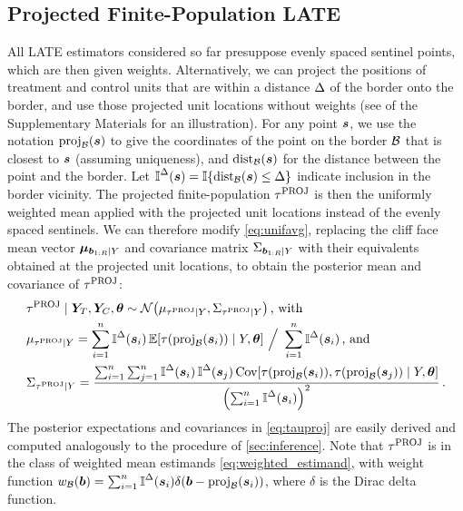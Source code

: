 \subsection{Projected Finite-Population LATE}
All LATE estimators considered so far presuppose evenly spaced sentinel points, which are then given weights.
Alternatively, we can project the positions of treatment and control units that are within a distance \(\Delta\) of the border onto the border, and use those projected unit locations without weights (see  of the Supplementary Materials for an illustration).
For any point \(\bm{s}\), we use the notation \(\proj_{\border}\del{\svec}\) to give the coordinates of the point on the border \(\mathcal{B}\) that is closest to \(\bm{s}\) (assuming uniqueness), and \(\dist_{\border}\del{\svec}\) for the distance between the point and the border.
Let \(\vicinity{\svec} = \allowbreak \Ind\cbr{\dist_{\border}\del{\svec} \le \buffer} \) indicate inclusion in the border vicinity.
The projected finite-population \(\tau^{\mathrm{PROJ}}\) is then the uniformly weighted mean applied with the projected unit locations instead of the evenly spaced sentinels.
We can therefore modify \autoref{eq:unifavg}, replacing the cliff face mean vector \(\bm{\mu}_{\bm{b}_{1:R} \mid Y}\)
and covariance matrix \(\Sigma_{\bm{b}_{1:R} \mid Y}\)
with their equivalents obtained at the projected unit locations,
to obtain the posterior mean and covariance of \(\tau^{\mathrm{PROJ}}\):
\begin{equation}\begin{split}
    &\tauproj \mid \yt{}, \yc{}, \hyperparam \sim \normal\del{\mu_{\tauproj \mid Y}, \Sigma_{\tauproj \mid Y}}\,\text{, with} \\
    &\mu_{\tauproj \mid Y} = 
    \sum_{i=1}^{n}
    \vicinity{\svec_i}
    \E\sbr{
        \tau\del{
            \proj_{\border}\del{\svec_i}
        }
        \mid Y, \hyperparam
    } 
    \ 
    \Big/
    \ 
        \sum_{i=1}^{n}
        \vicinity{\svec_i}
    \,\text{, and}\\
    &\Sigma_{\tauproj \mid Y} = 
    \frac{
        \sum_{i=1}^{n} 
        \sum_{j=1}^{n} 
        \vicinity{\svec_i}
        \vicinity{\svec_j}
        \cov\sbr{
            \tau\del{
                \proj_{\border}\del{\svec_i}
            },
            \tau\del{
                \proj_{\border}\del{\svec_j}
            }
            \mid Y, \hyperparam
        }
    }{
        \del{
            \sum_{i=1}^{n}
            \vicinity{\svec_i}
        }^2
    }
    \,.
\end{split}
\label{eq:tauproj}
\end{equation}
The posterior expectations and covariances in \autoref{eq:tauproj} are easily derived and computed analogously to the procedure of \autoref{sec:inference}.
Note that \(\tau^{\mathrm{PROJ}}\) is in the class of weighted mean estimands \autoref{eq:weighted_estimand},
with weight function \(\weightb(\sentinel) = \sum_{i=1}^{n} \vicinity{\svec_i} \delta\del{ \sentinel - \proj_\border(\svec_i)}\), where \(\delta\) is the Dirac delta function.

